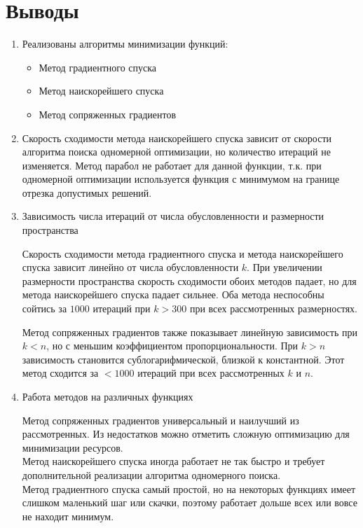 	
	\section{Выводы}
	
		\begin{enumerate}
		\item Реализованы алгоритмы минимизации функций:
		\begin{itemize}
			\item Метод градиентного спуска
			\item Метод наискорейшего спуска
			\item Метод сопряженных градиентов
		\end{itemize}
		
		\item Скорость сходимости метода наискорейшего спуска зависит от скорости алгоритма поиска одномерной оптимизации, но количество итераций не изменяется. Метод парабол не работает для данной функции, т.к. при одномерной оптимизации используется функция с минимумом на границе отрезка допустимых решений.
		
		\item Зависимость числа итераций от числа обусловленности и размерности пространства
		
		Скорость сходимости метода градиентного спуска и метода наискорейшего спуска зависит линейно от числа обусловленности \(k\). При увеличении размерности пространства скорость сходимости обоих методов падает, но для метода наискорейшего спуска падает сильнее. Оба метода неспособны сойтись за \(1000\) итераций при \(k > 300\) при всех рассмотренных размерностях.
	
		Метод сопряженных градиентов также показывает линейную зависимость при \(k < n\), но с меньшим коэффициентом пропорциональности. При \(k > n\) зависимость становится сублогарифмической, близкой к константной. Этот метод сходится за \( < 1000\) итераций при всех рассмотренных \(k\) и \(n\).
		
		\item Работа методов на различных функциях
		
		Метод сопряженных градиентов универсальный и наилучший из рассмотренных. Из недостатков можно отметить сложную оптимизацию для минимизации ресурсов.\\
		Метод наискорейшего спуска иногда работает не так быстро и требует дополнительной реализации алгоритма одномерного поиска.\\
		Метод градиентного спуска самый простой, но на некоторых функциях имеет слишком маленький шаг или скачки, поэтому работает дольше всех или вовсе не находит минимум. 
		
	\end{enumerate}

